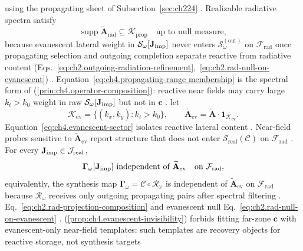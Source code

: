 using the propagating sheet of Subsection~\ref{sec:ch224} \cite{stratton1941}. Realizable radiative spectra
satisfy
\begin{equation}
\label{eq:ch4.propagating-realizable}
\operatorname{supp}\widetilde{\mathbf{A}}_{\mathrm{rad}}
\subseteq
\mathcal{K}_{\mathrm{prop}}
\quad\text{up to null measure},
\end{equation}
because evanescent lateral weight in $\mathcal{S}_\omega[\mathbf{J}_{\mathrm{imp}}]$ never enters $\mathcal{S}_\omega^{(\mathrm{out})}$ on $\mathcal{F}_{\mathrm{rad}}$ once propagating selection and outgoing completion separate reactive from radiative content (Eqs.~\eqref{eq:ch2.outgoing-radiation-refinement},~\eqref{eq:ch2.rad-null-on-evanescent})
\cite{stratton1941}. Equation~\eqref{eq:ch4.propagating-range membership} is the spectral form of
(\ref{prin:ch4.operator-composition}): reactive near fields may carry large \(k_{t}>k_{0}\) weight in raw
\(\mathcal{S}_\omega[\mathbf{J}_{\mathrm{imp}}]\) but not in \(\mathbf{c}\) \cite{harrington2001}.
let
\begin{equation}
\label{eq:ch4.evanescent-sector}
\mathcal{K}_{\mathrm{ev}}
=
\{(k_{x},k_{y}):k_{t}>k_{0}\},
\qquad
\widetilde{\mathbf{A}}_{\mathrm{ev}}
=
\widetilde{\mathbf{A}}\cdot\mathbf{1}_{\mathcal{K}_{\mathrm{ev}}}.
\end{equation}
Equation~\eqref{eq:ch4.evanescent-sector} isolates reactive lateral content \cite{stratton1941}. Near-field
probes sensitive to \(\widetilde{\mathbf{A}}_{\mathrm{ev}}\) report structure that does not enter
\(\mathcal{S}_{\mathrm{real}}(\mathcal{C})\) on \(\mathcal{F}_{\mathrm{rad}}\) \cite{harrington2001}. 
\label{prop:ch4.evanescent-invisibility}
For every \(\mathbf{J}_{\mathrm{imp}}\in\mathcal{J}_{\mathrm{real}}\),
\begin{equation}
\label{eq:ch4.evanescent-gamma-null}
\boldsymbol{\Gamma}_\omega[\Jimp]
\ \text{independent of}\ 
\widetilde{\mathbf{A}}_{\mathrm{ev}}
\quad\text{on}\ \mathcal{F}_{\mathrm{rad}},
\end{equation}
equivalently, the synthesis map $\boldsymbol{\Gamma}_\omega=\mathcal{C}\circ\mathcal{R}_\omega$ is independent of
$\widetilde{\mathbf{A}}_{\mathrm{ev}}$ on $\mathcal{F}_{\mathrm{rad}}$ because $\mathcal{R}_\omega$ receives only
outgoing propagating pairs after spectral filtering \cite{stratton1941}.
Eq.~\eqref{eq:ch2.rad-projection-composition} and evanescent null
Eq.~\eqref{eq:ch2.rad-null-on-evanescent} \cite{stratton1941}.
(\ref{prop:ch4.evanescent-invisibility}) forbids fitting far-zone \(\mathbf{c}\) with evanescent-only
near-field templates: such templates are recovery objects for reactive storage, not synthesis targets

